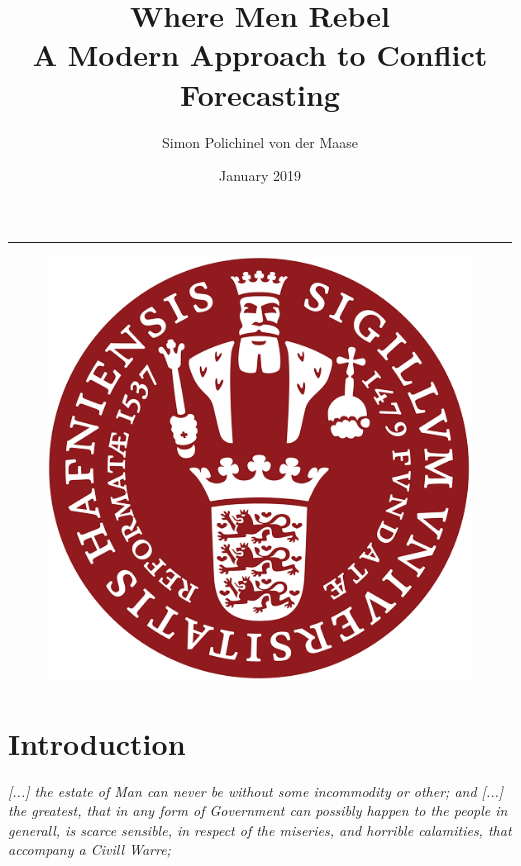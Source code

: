 \documentclass[a4paper]{article}
\title{Where Men Rebel\\A Modern Approach to Conflict Forecasting}
\author{Simon Polichinel von der Maase}
\date{January 2019}
\begin{document}
	\begin{titlepage}
		\maketitle
		\noindent\rule{\linewidth}{0.4pt}
		\begin{figure}[h]
			\centering
			\includegraphics[scale=0.32]{KU_logo.png}
		\end{figure}
		\thispagestyle{empty} %
	\end{titlepage}
    \tableofcontents
\pagebreak

\begin{abstract}

\end{abstract}
\pagebreak

\section{Introduction}

\begin{displayquote}
\emph{[...] the estate of Man can never be without some incommodity or other; and [...] the greatest, that in any form of Government can possibly happen to the people in generall, is scarce sensible, in respect of the miseries, and horrible calamities, that accompany a Civill Warre;} \cite[128]{Hobbes_1991}\par
\end{displayquote}
\end{document}
